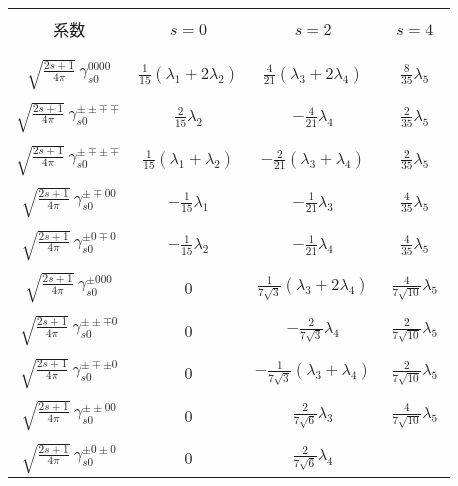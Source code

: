 \begin{table}
\centering
\begin{tabular}{|c|c|c|c|} \hline
 & & & \\
系数 & $s=0$ & $s=2$ & $\;\;s=4\;\;$ \\
 & & & \\ \hline
 & & & \\
$\sqrt{\frac{2s+1}{4\pi}}\>\gamma_{s0}^{0000}$ &
$\frac{1}{15}(\lambda_1+2\lambda_2)$ &
$\frac{4}{21}(\lambda_3+2\lambda_4)$ &
$\frac{8}{35}\lambda_5$ \\
 & & & \\
$\sqrt{\frac{2s+1}{4\pi}}\>\gamma_{s0}^{\pm\pm\mp\mp}$ &
$\frac{2}{15}\lambda_2$ &
$-\frac{4}{21}\lambda_4$ &
$\frac{2}{35}\lambda_5$ \\
 & & & \\
$\sqrt{\frac{2s+1}{4\pi}}\>\gamma_{s0}^{\pm\mp\pm\mp}$ &
$\frac{1}{15}(\lambda_1+\lambda_2)$ &
$-\frac{2}{21}(\lambda_3+\lambda_4)$ &
$\frac{2}{35}\lambda_5$ \\
 & & & \\
$\sqrt{\frac{2s+1}{4\pi}}\>\gamma_{s0}^{\pm\mp00}$ &
$-\frac{1}{15}\lambda_1$ &
$-\frac{1}{21}\lambda_3$ &
$\frac{4}{35}\lambda_5$ \\
 & & & \\
$\sqrt{\frac{2s+1}{4\pi}}\>\gamma_{s0}^{\pm0\mp0}$ &
$-\frac{1}{15}\lambda_2$ &
$-\frac{1}{21}\lambda_4$ &
$\frac{4}{35}\lambda_5$ \\
 & & & \\
$\sqrt{\frac{2s+1}{4\pi}}\>\gamma_{s0}^{\pm000}$ &
 0 &
$\frac{1}{7\sqrt{3}}(\lambda_3+2\lambda_4)$ &
$\frac{4}{7\sqrt{10}}\lambda_5$ \\
 & & & \\
$\sqrt{\frac{2s+1}{4\pi}}\>\gamma_{s0}^{\pm\pm\mp0}$ &
 0 &
$-\frac{2}{7\sqrt{3}}\lambda_4$ &
$\frac{2}{7\sqrt{10}}\lambda_5$ \\
 & & & \\
$\sqrt{\frac{2s+1}{4\pi}}\>\gamma_{s0}^{\pm\mp\pm0}$ &
 0 &
$-\frac{1}{7\sqrt{3}}(\lambda_3+\lambda_4)$ &
$\frac{2}{7\sqrt{10}}\lambda_5$ \\
 & & & \\
$\sqrt{\frac{2s+1}{4\pi}}\>\gamma_{s0}^{\pm\pm00}$ &
 0 &
$\frac{2}{7\sqrt{6}}\lambda_3$ &
$\frac{4}{7\sqrt{10}}\lambda_5$ \\
 & & & \\
$\sqrt{\frac{2s+1}{4\pi}}\>\gamma_{s0}^{\pm0\pm0}$ &
 0 &
$\frac{2}{7\sqrt{6}}\lambda_4$ &

\end{tabular}
\end{table}
